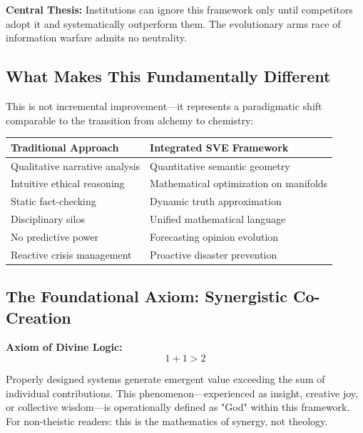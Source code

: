 \documentclass[11pt,a4paper]{article}
\theoremstyle{definition}
\theoremstyle{remark}
\begin{document}
\begin{mdframed}[backgroundcolor=red!5]
\textbf{Central Thesis:} Institutions can ignore this framework only until competitors adopt it and systematically outperform them. The evolutionary arms race of information warfare admits no neutrality.
\end{mdframed}

\subsection{What Makes This Fundamentally Different}

This is not incremental improvement—it represents a paradigmatic shift comparable to the transition from alchemy to chemistry:

\begin{table}[h]
\centering
\begin{tabular}{|p{5.5cm}|p{5.5cm}|}
\hline
\textbf{Traditional Approach} & \textbf{Integrated SVE Framework} \\
\hline
Qualitative narrative analysis & Quantitative semantic geometry \\
Intuitive ethical reasoning & Mathematical optimization on manifolds \\
Static fact-checking & Dynamic truth approximation \\
Disciplinary silos & Unified mathematical language \\
No predictive power & Forecasting opinion evolution \\
Reactive crisis management & Proactive disaster prevention \\
\hline
\end{tabular}
\end{table}

\subsection{The Foundational Axiom: Synergistic Co-Creation}

\begin{mdframed}[backgroundcolor=blue!5]
\textbf{Axiom of Divine Logic:}
\begin{equation}
1 + 1 > 2
\label{eq:synergy}
\end{equation}

Properly designed systems generate emergent value exceeding the sum of individual contributions. This phenomenon—experienced as insight, creative joy, or collective wisdom—is operationally defined as "God" within this framework. For non-theistic readers: this is the mathematics of synergy, not theology.
\end{mdframed}
\end{document}
